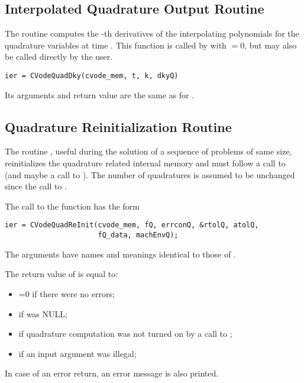 \subsection{Interpolated Quadrature Output Routine}

The routine  computes the -th derivatives of the interpolating 
polynomials for the quadrature variables at time .
This function is called by  with  $= 0$, but may also be called 
directly by the user.
\begin{verbatim}
ier = CVodeQuadDky(cvode_mem, t, k, dkyQ)
\end{verbatim}
Its arguments and return value are the same as for .

\subsection{Quadrature Reinitialization Routine}\label{sss:cvqreinit}

The routine , useful during the solution of a sequence of problems of 
same size, reinitializes the quadrature related internal memory 
and must follow a call to  (and maybe a call to ). 
The number  of quadratures is assumed to be unchanged since the call to 
.

The call to the  function has the form
\begin{verbatim}
ier = CVodeQuadReInit(cvode_mem, fQ, errconQ, &rtolQ, atolQ, 
                      fQ_data, machEnvQ);
\end{verbatim}
The arguments have names and meanings identical to those of .

The return value  of  is equal to: 
\begin{itemize}
\item {}=0 if there were no errors; 
\item {} if  was NULL;
\item {} if quadrature computation was not turned on
      by a call to ;
\item {} if an input argument was illegal;
\end{itemize}
In case of an error return, an error message is also printed.  

